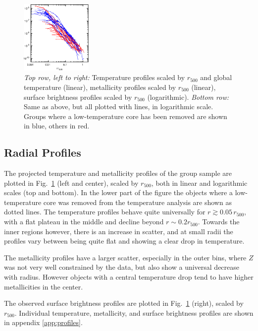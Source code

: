 \documentclass[structabstract]{aa}
\begin{document}
\begin{figure}[!ht]
  \includegraphics[width=0.31\textwidth]{sbps500_cc_c.eps}
  \caption{\emph{Top row, left to right:} Temperature profiles scaled
    by $r_{500}$ and global temperature (linear), metallicity profiles
    scaled by $r_{500}$ (linear), surface brightness profiles scaled
    by $r_{500}$ (logarithmic). \emph{Bottom row:} Same as above, but
    all plotted with lines, in logarithmic scale. Groups where a low-temperature core has been
    removed are shown in blue, others in red.}
 \label{fig:profiles}%
\end{figure}
 \subsection{Radial Prof\hspace{0mm}iles}\label{sec:results:profiles}
 The projected temperature and metallicity profiles of the group
 sample are plotted in Fig.\ \ref{fig:profiles} (left and center),
 scaled by $r_{500}$, both in linear and logarithmic scales (top and
 bottom). In the lower part of the figure the objects where a
 low-temperature core was removed from the temperature analysis are
 shown as dotted lines. The temperature profiles behave quite
 universally for $r \gtrsim 0.05\,r_{500}$, with a flat plateau in the
 middle and decline beyond $r \sim 0.2 r_{500}$. Towards the inner
 regions however, there is an increase in scatter, and at small radii
 the profiles vary between being quite flat and showing a clear drop
 in temperature.

    The metallicity profiles have a larger scatter, especially in the
    outer bins, where $Z$ was not very well constrained by the data,
    but also show a universal decrease with radius. However
      objects with a central temperature drop tend to have higher
      metallicities in the center.

The observed surface brightness profiles are plotted in Fig.\
\ref{fig:profiles} (right), scaled by $r_{500}$. Individual temperature,
metallicity, and surface brightness profiles are shown in appendix
\ref{app:profiles}.
%
\end{document}
